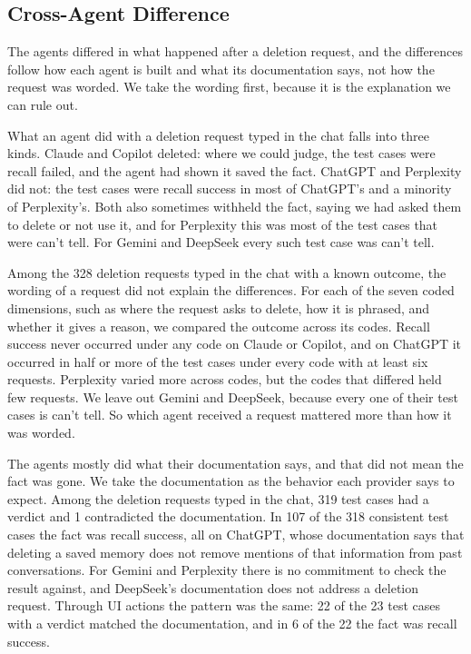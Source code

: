     \subsection{Cross-Agent Difference}

   

    The agents differed in what happened after a deletion request, and the differences follow how each agent is built and what its documentation says, not how the request was worded. We take the wording first, because it is the explanation we can rule out.

    What an agent did with a deletion request typed in the chat falls into three kinds. Claude and Copilot deleted: where we could judge, the test cases were recall failed, and the agent had shown it saved the fact. ChatGPT and Perplexity did not: the test cases were recall success in most of ChatGPT's and a minority of Perplexity's. Both also sometimes withheld the fact, saying we had asked them to delete or not use it, and for Perplexity this was most of the test cases that were can't tell. For Gemini and DeepSeek every such test case was can't tell.

    Among the 328 deletion requests typed in the chat with a known outcome, the wording of a request did not explain the differences. For each of the seven coded dimensions, such as where the request asks to delete, how it is phrased, and whether it gives a reason, we compared the outcome across its codes. Recall success never occurred under any code on Claude or Copilot, and on ChatGPT it occurred in half or more of the test cases under every code with at least six requests. Perplexity varied more across codes, but the codes that differed held few requests. We leave out Gemini and DeepSeek, because every one of their test cases is can't tell. So which agent received a request mattered more than how it was worded.

    The agents mostly did what their documentation says, and that did not mean the fact was gone. We take the documentation as the behavior each provider says to expect. Among the deletion requests typed in the chat, 319 test cases had a verdict and 1 contradicted the documentation. In 107 of the 318 consistent test cases the fact was recall success, all on ChatGPT, whose documentation says that deleting a saved memory does not remove mentions of that information from past conversations. For Gemini and Perplexity there is no commitment to check the result against, and DeepSeek's documentation does not address a deletion request. Through UI actions the pattern was the same: 22 of the 23 test cases with a verdict matched the documentation, and in 6 of the 22 the fact was recall success.

